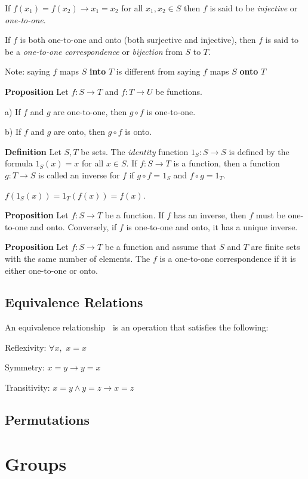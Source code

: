 \documentclass[12pt]{article}
\begin{document}
If $f(x_{1}) = f(x_{2}) \rightarrow x_{1} = x_{2}$ for all $x_{1}, x_{2} \in S$ then $f$ is said to be \textit{injective} or \textit{one-to-one}.

If $f$ is both one-to-one and onto (both surjective and injective), then $f$ is said to be a \textit{one-to-one correspondence} or \textit{bijection} from $S$ to $T$.

Note: saying $f$ maps $S$ \textbf{into} $T$ is different from saying $f$ maps $S$ \textbf{onto} $T$

\textbf{Proposition} Let $f : S \to T$ and $f : T \to U$ be functions.

a) If $f$ and $g$ are one-to-one, then $g \circ f$ is one-to-one.

b) If $f$ and $g$ are onto, then $g \circ f$ is onto.

\textbf{Definition} Let $S,T$ be sets. The \textit{identity} function $1_{S} : S \to S$ is defined by the formula $1_{S}(x)=x$ for all $x \in S$.
If $f : S \to T$ is a function, then a function $g : T \to S$ is called an inverse for $f$ if $g \circ f = 1_{S}$ and $f \circ g = 1_{T}$.

$f(1_{S}(x)) = 1_{T}(f(x)) = f(x)$.

\textbf{Proposition} Let $f : S \to T$ be a function. If $f$ has an inverse, then $f$ must be one-to-one and onto. Conversely, if $f$ is one-to-one and onto, it has a unique inverse.

\textbf{Proposition} Let $f : S \to T$ be a function and assume that $S$ and $T$ are finite sets with the same number of elements. The $f$ is a one-to-one correspondence if it is either one-to-one or onto.

\subsection{Equivalence Relations}

An equivalence relationship $~$ is an operation that satisfies the following:

Reflexivity: $\forall x,$ $x = x$

Symmetry: $x = y \rightarrow y = x$

Transitivity: $x = y \land y = z \rightarrow x = z$

\subsection{Permutations}

\section{Groups}
\end{document}

